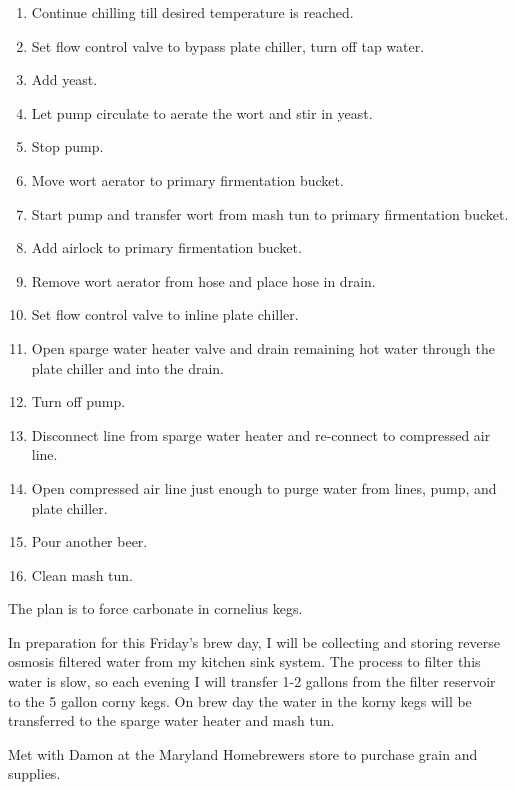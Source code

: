 \begin{enumerate}
    \item Continue chilling till desired temperature is reached.
    \item Set flow control valve to bypass plate chiller, turn off tap water.
    \item Add yeast.
    \item Let pump circulate to aerate the wort and stir in yeast.
    \item Stop pump.
    \item Move wort aerator to primary firmentation bucket.
    \item Start pump and transfer wort from mash tun to primary firmentation bucket.
    \item Add airlock to primary firmentation bucket.
    \item Remove wort aerator from hose and place hose in drain.
    \item Set flow control valve to inline plate chiller.
    \item Open sparge water heater valve and drain remaining hot water through the plate chiller and into the drain.
    \item Turn off pump.
    \item Disconnect line from sparge water heater and re-connect to compressed air line.
    \item Open compressed air line just enough to purge water from lines, pump, and plate chiller.
    \item Pour another beer.
    \item Clean mash tun.
\end{enumerate}

The plan is to force carbonate in cornelius kegs.

\FloatBarrier{}
In preparation for this Friday's brew day, I will be collecting and storing reverse osmosis filtered water from my kitchen sink system.  The process to filter this water is slow, so each evening I will transfer 1-2 gallons from the filter reservoir to the 5 gallon corny kegs.  On brew day the water in the korny kegs will be transferred to the sparge water heater and mash tun.


\FloatBarrier{}
Met with Damon at the Maryland Homebrewers store to purchase grain and supplies.


\FloatBarrier{}

